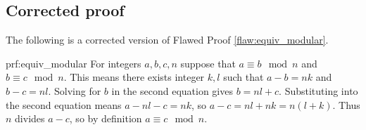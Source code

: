 \clearpage
\subsection{Corrected proof}

The following is a corrected version of Flawed Proof \ref{flaw:equiv_modular}. %

\begin{prf}{prf:equiv_modular} %
For integers $a,b,c,n$ suppose that $a \equiv b \mod n$ and $b \equiv c \mod n$. This means there exists integer $k, l$ such that $a-b = nk$ and $b-c = nl$. Solving for $b$ in the second equation gives $b = nl + c$. Substituting into the second equation means $a - nl - c = nk$, so $a-c = nl + nk = n(l + k)$. Thus $n$ divides $a-c$, so by definition $a\equiv c \mod n$. 
\end{prf}